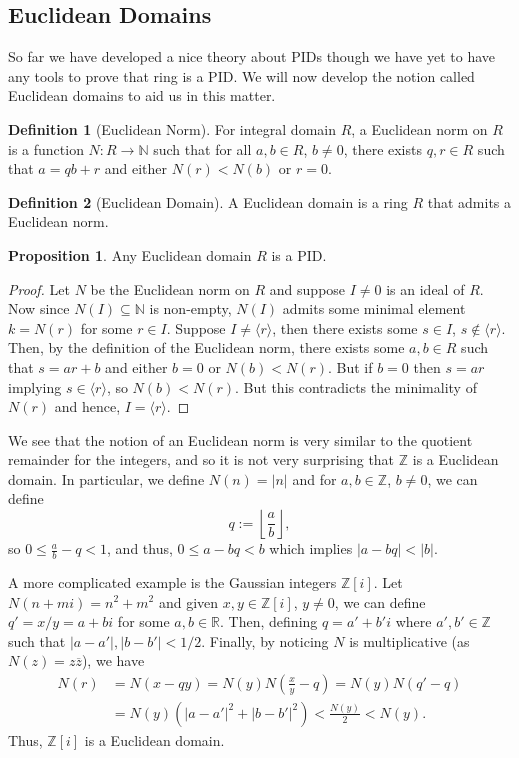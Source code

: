 \documentclass[]{article}
\theoremstyle{definition}
\theoremstyle{definition}
\newtheorem{definition}{Definition}[section]
\newtheorem{proposition}{Proposition}[section]
\begin{document}
\subsection{Euclidean Domains}

So far we have developed a nice theory about PIDs though we have yet to have 
any tools to prove that ring is a PID. We will now develop the notion called 
Euclidean domains to aid us in this matter.

\begin{definition}[Euclidean Norm]
  For integral domain \(R\), a Euclidean norm on \(R\) is a function 
  \(N : R \to \mathbb{N}\) such that for all \(a, b \in R\), \(b \neq 0\), 
  there exists \(q, r \in R\) such that \(a = qb + r\) and either 
  \(N(r) < N(b)\) or \(r = 0\).
\end{definition}

\begin{definition}[Euclidean Domain]
  A Euclidean domain is a ring \(R\) that admits a Euclidean norm.
\end{definition}

\begin{proposition}
  Any Euclidean domain \(R\) is a PID.
\end{proposition}
\begin{proof}
  Let \(N\) be the Euclidean norm on \(R\) and suppose \(I \neq 0\) is an ideal of 
  \(R\). Now since \(N(I) \subseteq \mathbb{N}\) is non-empty, \(N(I)\) admits 
  some minimal element \(k = N(r)\) for some \(r \in I\). Suppose 
  \(I \neq \langle r \rangle\), then there exists some \(s \in I\), 
  \(s \not\in \langle r \rangle\). Then, by the definition of the Euclidean norm, 
  there exists some \(a, b \in R\) such that \(s = ar + b\) and either \(b = 0\) 
  or \(N(b) < N(r)\). But if \(b = 0\) then \(s = ar\) implying 
  \(s \in \langle r \rangle\), so \(N(b) < N(r)\). But this contradicts the 
  minimality of \(N(r)\) and hence, \(I = \langle r \rangle\).
\end{proof}

We see that the notion of an Euclidean norm is very similar to the quotient 
remainder for the integers, and so it is not very surprising that \(\mathbb{Z}\) 
is a Euclidean domain. In particular, we define \(N(n) = |n|\) and for 
\(a, b \in \mathbb{Z}\), \(b \neq 0\), we can define 
\[q := \left\lfloor\frac{a}{b}\right\rfloor,\]
so \(0 \le \frac{a}{b} - q < 1\), and thus, \(0 \le a - bq < b\) which 
implies \(|a - bq| < |b|\).

A more complicated example is the Gaussian integers \(\mathbb{Z}[i]\). 
Let \(N(n + mi) = n^2 + m^2\) and given \(x, y \in \mathbb{Z}[i]\), 
\(y \neq 0\), we can define \(q' = x / y = a + bi\) 
for some \(a, b \in \mathbb{R}\). Then, defining \(q = a' + b'i\) where 
\(a', b' \in \mathbb{Z}\) such that \(|a - a'|, |b - b'| < 1 / 2\). Finally, 
by noticing \(N\) is multiplicative (as \(N(z) = z \overline{z}\)),
we have 
\[\begin{split}
  N(r) & = N(x - qy) = N(y)N\left(\frac{x}{y} - q\right) = 
  N(y)N(q' - q)\\ & = N(y)(|a - a'|^2 + |b - b'|^2) < \frac{N(y)}{2} < N(y).
\end{split}\]
Thus, \(\mathbb{Z}[i]\) is a Euclidean domain.
\end{document}
